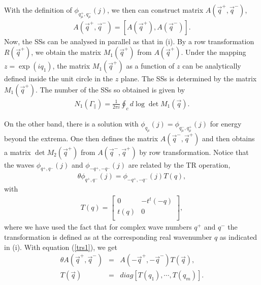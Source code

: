 \documentclass[aps,pra,amsmath,twocolumn,showpacs,bibnotes,10pt]{revtex4-1}
\begin{document}
With the definition of $\phi_{q^+_{\mu},q^-_{\mu}}(j)$, we then can construct matrix $A(\vec q^+,\vec q^-)$,
\begin{eqnarray}
A(\vec q^+,\vec q^-) = [A(\vec q^+), A(\vec q^-)].
\end{eqnarray}
Now, the SSs can be analysed in parallel as that in (i). By a row transformation $R(\vec q^+)$, we obtain the matrix $M_1(\vec q^+)$ from $A(\vec q^+)$. Under the mapping $z = \exp(iq_1)$, the matrix $M_1(\vec q^+)$ as a function of $z$ can be analytically defined inside the unit circle in the $z$ plane. The SSs is determined by 
the matrix $M_1(\vec q^+)$. The number of the SSs so obtained is given by 
\begin{eqnarray}
N_1(\Gamma_{\parallel}) = \frac{1}{2\pi i}\oint_{c}d\log \det M_1(\vec q).  \nonumber
\end{eqnarray}

On the other band, there is a solution with $\phi_{q_{\mu}}(j) = \phi_{q^-_{\mu},q^+_{\mu}}(j)$ for energy beyond the extrema. One then defines the matrix $A(\vec q^-,\vec q^+)$ and then obtains a matrix $\det M_2(\vec q^+)$ from $A(\vec q^-,\vec q^+)$ by row transformation. Notice that the waves $\phi_{q^+,q^-}(j)$ and $\phi_{-q^+,-q^-}(j)$ are related by the TR operation, 
\begin{eqnarray}
\theta \phi_{q^+,q^-}(j) = \phi_{-q^+,-q^-}(j)T(q),  \label{trs1}
\end{eqnarray}
with
\begin{eqnarray}
T(q) = \begin{bmatrix}
	0&-t^{t}(-q)\\
	t(q)&0\\
\end{bmatrix}, \nonumber  
\end{eqnarray}
where we have used the fact that for complex wave numbers $q^+$ and $q^-$ the transformation is defined as at the corresponding real wavenumber $q$ as indicated in (i). With equation (\ref{trs1}), we get
\begin{eqnarray}
\theta A(\vec q^+,\vec q^-) &=& A(-\vec q^+,-\vec q^-) T(\vec q),  \label{eqd1}\\
T(\vec q) &=& diag[T(q_1),\cdots,T(q_m)].   \label{mtx1} 
\end{eqnarray}
\end{document}
